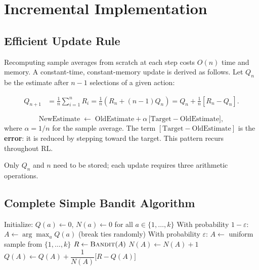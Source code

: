 \documentclass[11pt,a4paper]{article}
\theoremstyle{definition}
\theoremstyle{plain}
\theoremstyle{remark}
\begin{document}
\section{Incremental Implementation}

\subsection{Efficient Update Rule}

Recomputing sample averages from scratch at each step costs $O(n)$ time and memory. A constant-time, constant-memory update is derived as follows. Let $Q_n$ be the estimate after $n-1$ selections of a given action:

\begin{align*}
    Q_{n+1} &= \frac{1}{n}\sum_{i=1}^{n} R_i
    = \frac{1}{n}\!\left(R_n + (n-1)Q_n\right)
    = Q_n + \frac{1}{n}\!\left[R_n - Q_n\right].
\end{align*}

\begin{tcolorbox}[colback=blue!5!white,colframe=blue!60!black,title=\textbf{Incremental Update (General Form)}]
\[
    \text{NewEstimate} \;\leftarrow\; \text{OldEstimate} + \alpha\,\bigl[\text{Target} - \text{OldEstimate}\bigr],
\]
where $\alpha = 1/n$ for the sample average. The term $[\text{Target} - \text{OldEstimate}]$ is the \textbf{error}: it is reduced by stepping toward the target. This pattern recurs throughout RL.
\end{tcolorbox}

Only $Q_n$ and $n$ need to be stored; each update requires three arithmetic operations.

\subsection{Complete Simple Bandit Algorithm}

\begin{algorithm}
\caption{Simple Bandit ($\varepsilon$-greedy, sample average)}
\begin{algorithmic}
\STATE Initialize: $Q(a) \leftarrow 0$, $N(a) \leftarrow 0$ for all $a \in \{1, \ldots, k\}$
\LOOP
    \STATE With probability $1-\varepsilon$: $A \leftarrow \arg\max_a Q(a)$ (break ties randomly)
    \STATE With probability $\varepsilon$: $A \leftarrow$ uniform sample from $\{1,\ldots,k\}$
    \STATE $R \leftarrow \textsc{Bandit}(A)$
    \STATE $N(A) \leftarrow N(A) + 1$
    \STATE $Q(A) \leftarrow Q(A) + \dfrac{1}{N(A)}\bigl[R - Q(A)\bigr]$
\ENDLOOP
\end{algorithmic}
\end{algorithm}
\end{document}
